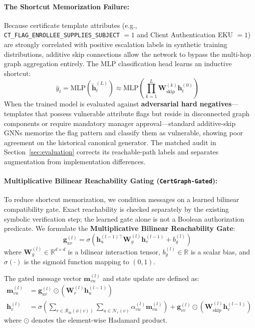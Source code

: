 \paragraph{The Shortcut Memorization Failure:}
Because certificate template attributes (e.g., \texttt{CT\_FLAG\_ENROLLEE\_SUPPLIES\_SUBJECT} $= 1$ and Client Authentication EKU $= 1$) are strongly correlated with positive escalation labels in synthetic training distributions, additive skip connections allow the network to bypass the multi-hop graph aggregation entirely. The MLP classification head learns an inductive shortcut:
\begin{equation}
\hat{y}_t = \text{MLP}(\tilde{\mathbf{h}}_t^{(L)}) \approx \text{MLP} \left( \prod_{k=1}^L \mathbf{W}_{\text{skip}}^{(k)} \mathbf{h}_t^{(0)} \right)
\end{equation}
When the trained model is evaluated against \textbf{adversarial hard negatives}—templates that possess vulnerable attribute flags but reside in disconnected graph components or require mandatory manager approval—standard additive-skip GNNs memorize the flag pattern and classify them as vulnerable, showing poor agreement on the historical canonical generator. The matched audit in Section~\ref{sec:evaluation} corrects its reachable-path labels and separates augmentation from implementation differences.

\paragraph{Multiplicative Bilinear Reachability Gating (\texttt{CertGraph-Gated}):}
To reduce shortcut memorization, we condition messages on a learned bilinear compatibility gate. Exact reachability is checked separately by the existing symbolic verification step; the learned gate alone is not a Boolean authorization predicate. We formulate the \textbf{Multiplicative Bilinear Reachability Gate}:
\begin{equation}
\mathbf{g}_{uv}^{(l)} = \sigma \left( \mathbf{h}_u^{(l-1)\top} \mathbf{W}_g^{(l)} \mathbf{h}_v^{(l-1)} + b_g^{(l)} \right)
\end{equation}
where $\mathbf{W}_g^{(l)} \in \mathbb{R}^{d \times d}$ is a bilinear interaction tensor, $b_g^{(l)} \in \mathbb{R}$ is a scalar bias, and $\sigma(\cdot)$ is the sigmoid function mapping to $(0, 1)$.

The gated message vector $\mathbf{m}_{vu}^{(l)}$ and state update are defined as:
\begin{align}
\mathbf{m}_{vu}^{(l)} &= \mathbf{g}_{uv}^{(l)} \odot \left( \mathbf{W}_r^{(l)} \mathbf{h}_u^{(l-1)} \right) \\
\mathbf{h}_v^{(l)} &= \sigma \left( \sum_{r \in \mathcal{R}_{\text{in}}(\phi(v))} \sum_{u \in \mathcal{N}_r(v)} \alpha_{vu}^{(l)} \mathbf{m}_{vu}^{(l)} \right) + \mathbf{g}_{vv}^{(l)} \odot \left( \mathbf{W}_{\text{skip}}^{(l)} \mathbf{h}_v^{(l-1)} \right)
\end{align}
where $\odot$ denotes the element-wise Hadamard product.


